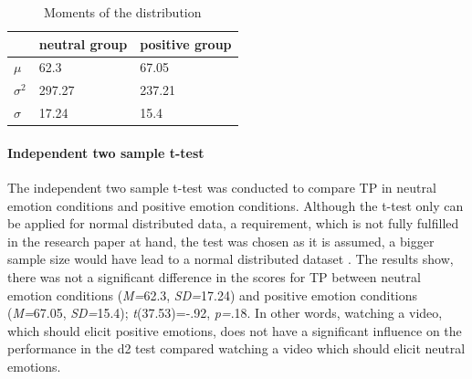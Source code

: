 \documentclass[	
	12pt, %
	a4paper, %
  abstracton
]{scrartcl}\usepackage[]{graphicx}\usepackage[]{color}
\begin{document}
\begin{table}[htb]
\caption{Moments of the distribution}
\centering
\begin{tabularx}{\textwidth}{XXX}
\toprule
  & neutral group & positive group\\ 
\midrule
\(\mu\) & 62.3 & 67.05 \\ 
\(\sigma^{2}\) & 297.27 & 237.21 \\ 
\(\sigma\) & 17.24 & 15.4 \\ 
\bottomrule
\end{tabularx} 
\label{moments_dist}

\end{table}













\paragraph{Independent two sample t-test}
\label{wilcoxon}
The independent two sample t-test was conducted to compare TP in neutral emotion conditions and positive emotion conditions. Although the t-test only can be applied for normal distributed data, a requirement, which is not fully fulfilled in the research paper at hand, the test was chosen as it is assumed, a bigger sample size would have lead to a normal distributed dataset \cite{Dalgaard2008}. The results show, there was not a significant difference in the scores for TP between neutral emotion conditions (\textit{M=}62.3, \textit{SD=}17.24) and positive emotion conditions (\textit{M=}67.05, \textit{SD=}15.4); \textit{t}(37.53)=-.92, \textit{p=}.18. In other words, watching a video, which should elicit positive emotions, does not have a significant influence on the performance in the d2 test compared watching a video which should elicit neutral emotions.


\end{document}
